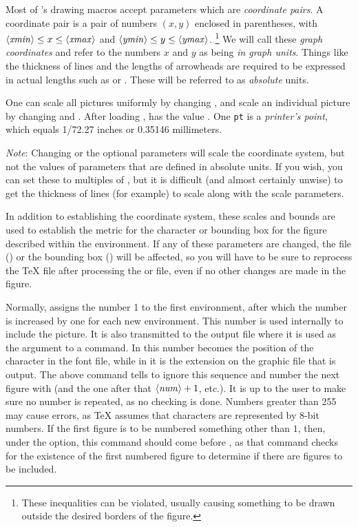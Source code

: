 \documentclass[letterpaper]{article}
\begin{document}
Most of \mfp{}'s drawing macros accept parameters which are
\emph{coordinate pairs}. A coordinate pair is a pair of numbers $(x,y)$
enclosed in parentheses, with $\langle\mbox{\rmfamily\itshape xmin\/}\rangle \le x \le \langle\mbox{\rmfamily\itshape xmax\/}\rangle$ and
$\langle\mbox{\rmfamily\itshape ymin\/}\rangle
\le y \le \langle\mbox{\rmfamily\itshape ymax\/}\rangle$.%
    \footnote{These inequalities can be violated, usually causing
    something to be drawn outside the desired borders of the figure.}
We will call these \emph{graph coordinates} and refer to the numbers $x$
and $y$ as being \emph{in graph units}. Things like the thickness of
lines and the lengths of arrowheads are required to be expressed in
actual lengths such as \dim{1pt} or \dim{3mm}. These will be referred to as
\emph{absolute} units.

One can scale all pictures uniformly by changing , and
scale an individual picture by changing  and .
After loading \mfp{},  has the value \dim{1pt}. One
\texttt{pt} is a \emph{printer's point}, which equals 1/72.27 inches or
0.35146 millimeters.

\emph{Note}: Changing  or the optional parameters will
scale the coordinate system, but not the values of parameters that are
defined in absolute units. If you wish, you can set these to multiples
of , but it is difficult (and almost certainly unwise) to
get the thickness of lines (for example) to scale along with the scale
parameters.

In addition to establishing the coordinate system, these scales and
bounds are used to establish the metric for the \MF{} character or
bounding box for the \MP{} figure described within the environment. If
any of these parameters are changed, the  file (\MF{}) or the
bounding box (\MP{}) will be affected, so you will have to be sure to
reprocess the \TeX{} file after processing the  or 
file, even if no other changes are made in the figure.

\begin{cd}
%
\end{cd}

Normally,  assigns the number 1 to the first 
environment, after which the number is increased by one for each new
 environment. This number is used internally to include the
picture. It is also transmitted to the output file where it is used as
the argument to a  command. In \MF{} this number becomes
the position of the character in the font file, while in \MP{} it is the
extension on the graphic file that is output. The above command tells
\mfp{} to ignore this sequence and number the next 
figure with  (and the one after that $\langle\mbox{\rmfamily\itshape num\/}\rangle+1$, etc.). It
is up to the user to make sure no number is repeated, as no checking is
done. Numbers greater than 255 may cause errors, as \TeX{} assumes that
characters are represented by 8-bit numbers. If the first figure is to
be numbered something other than $1$, then, under the 
option, this command should come before , as that
command checks for the existence of the first numbered figure to
determine if there are figures to be included.
\end{document}
